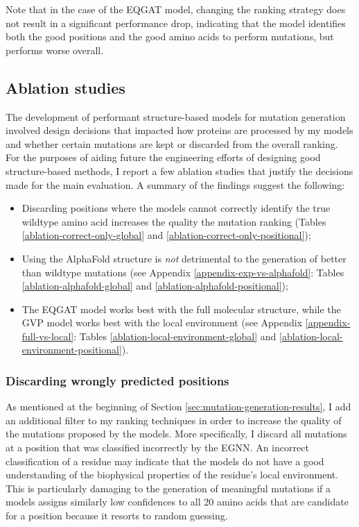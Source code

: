 Note that in the case of the EQGAT model, changing the ranking strategy does not result in a significant performance drop, indicating that the model identifies both the good positions and the good amino acids to perform mutations, but performs worse overall.

\subsection{Ablation studies}
The development of performant structure-based models for mutation generation involved design decisions that impacted how proteins are processed by my models and whether certain mutations are kept or discarded from the overall ranking. 
For the purposes of aiding future the engineering efforts of designing good structure-based methods, I report a few ablation studies that justify the decisions made for the main evaluation. A summary of the findings suggest the following: 
\begin{itemize}
    \item Discarding positions where the models cannot correctly identify the true wildtype amino acid increases the quality the mutation ranking (Tables \ref{ablation-correct-only-global} and \ref{ablation-correct-only-positional});
    \item Using the AlphaFold structure is \textit{not} detrimental to the generation of better than wildtype mutations (see Appendix \ref{appendix-exp-vs-alphafold}: Tables \ref{ablation-alphafold-global} and \ref{ablation-alphafold-positional});
    \item The EQGAT model works best with the full molecular structure, while the GVP model works best with the local environment (see Appendix \ref{appendix-full-vs-local}: Tables \ref{ablation-local-environment-global} and \ref{ablation-local-environment-positional}).
\end{itemize}

\subsubsection{Discarding wrongly predicted positions}
\label{mutation-discard}
As mentioned at the beginning of Section \ref{sec:mutation-generation-results}, I add an additional filter to my ranking techniques in order to increase the quality of the mutations proposed by the models. More specifically, I discard all mutations at a position that was classified incorrectly by the EGNN. An incorrect classification of a residue may indicate that the models do not have a good understanding of the biophysical properties of the residue's local environment. This is particularly damaging to the generation of meaningful mutations if a models assigns similarly low confidences to all 20 amino acids that are candidate for a position because it resorts to random guessing. 

